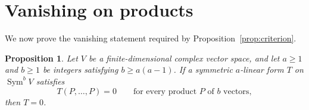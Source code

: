 \documentclass[11pt]{article}
\newtheorem{proposition}[theorem]{Proposition}
\theoremstyle{remark}
\DeclareMathOperator{\Sym}{Sym}
\begin{document}
\section{Vanishing on products}\label{sec:vanishing}

We now prove the vanishing statement required by
Proposition~\ref{prop:criterion}.

\begin{proposition}\label{prop:vanishing}
Let $V$ be a finite-dimensional complex vector space, and let $a\ge1$ and
$b\ge1$ be integers satisfying $b\ge a(a-1)$.
If a symmetric $a$-linear form $T$ on $\Sym^b V$ satisfies
\begin{equation}\label{eq:diagonal}
 T(P,\ldots,P)=0
 \qquad\text{for every product $P$ of $b$ vectors},
\end{equation}
then $T=0$.
\end{proposition}
\end{document}
